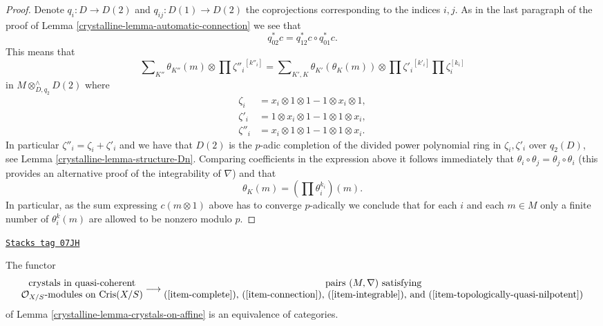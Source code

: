 \begin{proof}
\medskip\noindent
Denote $q_i : D \to D(2)$ and $q_{ij} : D(1) \to D(2)$ the coprojections
corresponding to the indices $i, j$. As in the last paragraph of the proof of
Lemma \ref{crystalline-lemma-automatic-connection}
we see that
$$
q_{02}^*c = q_{12}^*c \circ q_{01}^*c.
$$
This means that
$$
\sum\nolimits_{K''} \theta_{K''}(m) \otimes \prod {\zeta''_i}^{[k''_i]}
=
\sum\nolimits_{K', K} \theta_{K'}(\theta_K(m))
\otimes \prod {\zeta'_i}^{[k'_i]} \prod \zeta_i^{[k_i]}
$$
in $M \otimes^\wedge_{D, q_2} D(2)$ where
\begin{align*}
\zeta_i & = x_i \otimes 1 \otimes 1 - 1 \otimes x_i \otimes 1,\\
\zeta'_i & = 1 \otimes x_i \otimes 1 - 1 \otimes 1 \otimes x_i,\\
\zeta''_i & = x_i \otimes 1 \otimes 1 - 1 \otimes 1 \otimes x_i.
\end{align*}
In particular $\zeta''_i = \zeta_i + \zeta'_i$ and we have that
$D(2)$ is the $p$-adic completion of the divided power polynomial
ring in $\zeta_i, \zeta'_i$ over $q_2(D)$, see Lemma \ref{crystalline-lemma-structure-Dn}.
Comparing coefficients in the expression above it follows immediately that
$\theta_i \circ \theta_j = \theta_j \circ \theta_i$
(this provides an alternative proof of the integrability of $\nabla$) and that
$$
\theta_K(m) = (\prod \theta_i^{k_i})(m).
$$
In particular, as the sum expressing $c(m \otimes 1)$ above has to converge
$p$-adically we conclude that for each $i$ and each $m \in M$ only a finite
number of $\theta_i^k(m)$ are allowed to be nonzero modulo $p$.
\end{proof}

\begin{proposition}
\label{crystalline-proposition-crystals-on-affine}
\href{https://stacks.math.columbia.edu/tag/07JH}{\texttt{Stacks tag 07JH}}

The functor
$$
\begin{matrix}
\text{crystals in quasi-coherent} \\
\mathcal{O}_{X/S}\text{-modules on }\text{Cris}(X/S)
\end{matrix}
\longrightarrow
\begin{matrix}
\text{pairs }(M, \nabla)\text{ satisfying} \\
\text{(\ref{item-complete}), (\ref{item-connection}),
(\ref{item-integrable}), and (\ref{item-topologically-quasi-nilpotent})}
\end{matrix}
$$
of Lemma \ref{crystalline-lemma-crystals-on-affine}
is an equivalence of categories.
\end{proposition}

